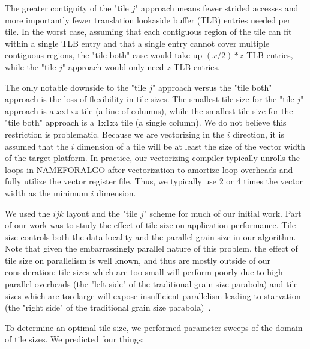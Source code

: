 \documentclass{sig-alternate-05-2015}
\begin{document}
The greater contiguity of the "tile \(j\)" approach means fewer strided
accesses and more importantly fewer translation lookaside buffer (TLB) entries
needed per tile. In the worst case, assuming that each contiguous region of the
tile can fit within a single TLB entry and that a single entry cannot cover
multiple contiguous regions, the "tile both" case would take up \((x/2)*z\) TLB
entries, while the "tile \(j\)" approach would only need \(z\) TLB entries.

The only notable downside to the "tile \(j\)" approach versus the "tile both"
approach is the loss of flexibility in tile sizes. The smallest tile size for
the "tile \(j\)" approach is a \(x\)x\(1\)x\(z\) tile (a line of columns),
while the smallest tile size for the "tile both" approach is a
\(1\)x\(1\)x\(z\) tile (a single column). We do not believe this restriction is
problematic. Because we are vectorizing in the \(i\) direction, it is assumed
that the \(i\) dimension of a tile will be at least the size of the vector
width of the target platform. In practice, our vectorizing compiler typically
unrolls the loops in NAMEFORALGO after vectorization to amortize loop overheads
and fully utilize the vector register file. Thus, we typically use 2 or 4 times
the vector width as the minimum \(i\) dimension. 

We used the \(ijk\) layout and the "tile \(j\)" scheme for much of our initial
work. Part of our work was to study the effect of tile size on application
performance.  Tile size controls both the data locality and the parallel grain
size in our algorithm. Note that given the embarrassingly parallel nature of
this problem, the effect of tile size on parallelism is well known, and thus
are mostly outside of our consideration: tile sizes which are too small will
perform poorly due to high parallel overheads (the "left side" of the
traditional grain size parabola) and tile sizes which are too large will expose
insufficient parallelism leading to starvation (the "right side" of the
traditional grain size parabola)~\cite{some_parallex_thing}.

To determine an optimal tile size, we performed parameter sweeps of the domain
of tile sizes. We predicted four things:
\end{document}
